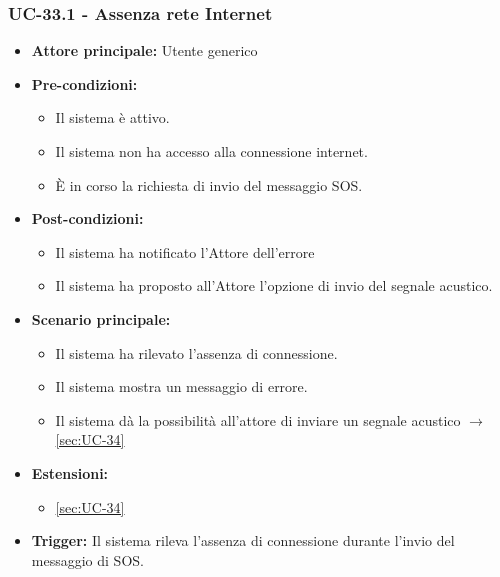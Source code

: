 \documentclass[a4paper,12pt]{article}
\begin{document}
\subsubsection{UC-33.1 - Assenza rete Internet} \label{sec:UC-33.1}
\begin{itemize}
    \item \textbf{Attore principale:} Utente generico
    \item \textbf{Pre-condizioni:} 
    \begin{itemize}
        \item Il sistema è attivo.
        \item Il sistema non ha accesso alla connessione internet.
	    \item È in corso la richiesta di invio del messaggio SOS.
    \end{itemize}	

    \item \textbf{Post-condizioni:}
    \begin{itemize}
        \item Il sistema ha notificato l'Attore dell'errore
        \item Il sistema ha proposto all'Attore l'opzione di invio del segnale acustico.
    \end{itemize}
    \item \textbf{Scenario principale:} 
    \begin{itemize}
        \item Il sistema ha rilevato l'assenza di connessione.
        \item Il sistema mostra un messaggio di errore.
        \item Il sistema dà la possibilità all'attore di inviare un segnale acustico $\rightarrow$ \ref{sec:UC-34}
    \end{itemize}
    \item \textbf{Estensioni:}
    \begin{itemize}
        \item \ref{sec:UC-34}
    \end{itemize}
    \item \textbf{Trigger:} Il sistema rileva l'assenza di connessione durante l'invio del messaggio di SOS.
\end{itemize}
\end{document}
